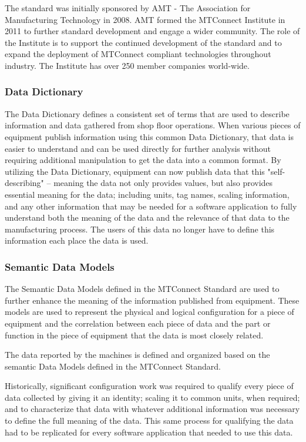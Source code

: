 The standard was initially sponsored by AMT - The Association for Manufacturing Technology in 2008.  AMT formed the MTConnect Institute in 2011 to further standard development and engage a wider community. The role of the Institute is to support the continued development of the standard and to expand the deployment of MTConnect compliant technologies throughout industry. The Institute has over 250 member companies world-wide.  


\subsubsection{Data Dictionary}

The Data Dictionary defines a consistent set of terms that are used to describe information and data gathered from shop floor operations.   When various pieces of equipment publish information using this common Data Dictionary, that data is easier to understand and can be used directly for further analysis without requiring additional manipulation to get the data into a common format.  By utilizing the Data Dictionary, equipment can now publish data that this "self-describing" – meaning the data not only provides values, but also provides essential meaning for the data; including units, tag names, scaling information, and any other information that may be needed for a software application to fully understand both the meaning of the data and the relevance of that data to the manufacturing process.    The users of this data no longer have to define this information each place the data is used. 

\subsubsection{Semantic Data Models}
The Semantic Data Models defined in the MTConnect Standard are used to further enhance the meaning of the information published from equipment.  These models are used to represent the physical and logical configuration for a piece of equipment and the correlation between each piece of data and the part or function in the piece of equipment that the data is most closely related.   

The data reported by the machines is defined and organized based on the semantic Data Models defined in the MTConnect Standard.   

Historically, significant configuration work was required to qualify every piece of data collected by giving it an identity; scaling it to common units, when required; and to characterize that data with whatever additional information was necessary to define the full meaning of the data.   This same process for qualifying the data had to be replicated for every software application that needed to use this data.    

